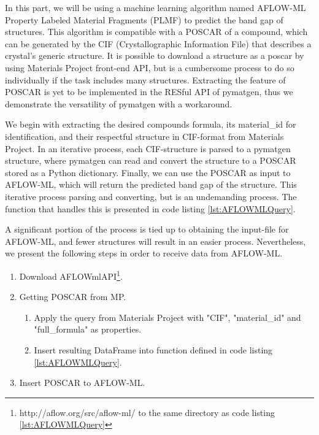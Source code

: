 In this part, we will be using a machine learning algorithm named AFLOW-ML Property Labeled Material Fragments (PLMF) \cite{Isayev2017} to predict the band gap of structures. This algorithm is compatible with a POSCAR of a compound, which can be generated by the CIF (Crystallographic Information File) that describes a crystal's generic structure. It is possible to download a structure as a poscar by using Materials Project front-end API, but is a cumbersome process to do so individually if the task includes many structures. Extracting the feature of POSCAR is yet to be implemented in the RESful API of pymatgen, thus we demonstrate the versatility of pymatgen with a workaround.

We begin with extracting the desired compounds formula, its material\_id for identification, and their respectful structure in CIF-format from Materials Project. In an iterative process, each CIF-structure is parsed to a pymatgen structure, where pymatgen can read and convert the structure to a POSCAR stored as a Python dictionary. Finally, we can use the POSCAR as input to AFLOW-ML, which will return the predicted band gap of the structure. This iterative process parsing and converting, but is an undemanding process. The function that handles this is presented in code listing \ref{lst:AFLOWMLQuery}.

A significant portion of the process is tied up to obtaining the input-file for AFLOW-ML, and fewer structures will result in an easier process. Nevertheless, we present the following steps in order to receive data from AFLOW-ML.

\begin{enumerate}
  \item Download AFLOWmlAPI\footnote{http://aflow.org/src/aflow-ml/ to the same directory as code listing \ref{lst:AFLOWMLQuery}}.
  \item Getting POSCAR from MP.
  \begin{enumerate}
    \item Apply the query from Materials Project with "CIF", "material\_id" and "full\_formula" as properties.
    \item Insert resulting DataFrame into function defined in code listing \ref{lst:AFLOWMLQuery}.
  \end{enumerate}
    \item Insert POSCAR to AFLOW-ML.
\end{enumerate}



